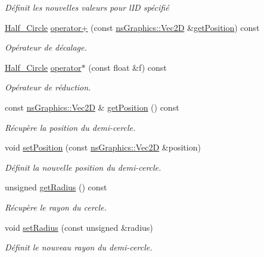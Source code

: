 \begin{DoxyCompactItemize}
\begin{DoxyCompactList}\small\item\em Définit les nouvelles valeurs pour l\textquotesingle{}ID spécifié \end{DoxyCompactList}\item 
\hyperlink{classhalf__circle_1_1_half___circle}{Half\+\_\+\+Circle} \hyperlink{classhalf__circle_1_1_half___circle_aad1321266f1c80f93426c7b0f906700b}{operator+} (const \hyperlink{classns_graphics_1_1_vec2_d}{ns\+Graphics\+::\+Vec2D} \&\hyperlink{classhalf__circle_1_1_half___circle_abf7d74a747e38464e7897a4e1c54caad}{get\+Position}) const
\begin{DoxyCompactList}\small\item\em Opérateur de décalage. \end{DoxyCompactList}\item 
\hyperlink{classhalf__circle_1_1_half___circle}{Half\+\_\+\+Circle} \hyperlink{classhalf__circle_1_1_half___circle_a378f3ccdfd80602eef6123812aa6281e}{operator$\ast$} (const float \&f) const
\begin{DoxyCompactList}\small\item\em Opérateur de réduction. \end{DoxyCompactList}\item 
const \hyperlink{classns_graphics_1_1_vec2_d}{ns\+Graphics\+::\+Vec2D} \& \hyperlink{classhalf__circle_1_1_half___circle_abf7d74a747e38464e7897a4e1c54caad}{get\+Position} () const
\begin{DoxyCompactList}\small\item\em Récupère la position du demi-\/cercle. \end{DoxyCompactList}\item 
void \hyperlink{classhalf__circle_1_1_half___circle_aef4c8e9f8a7d86c0062511ee24646afa}{set\+Position} (const \hyperlink{classns_graphics_1_1_vec2_d}{ns\+Graphics\+::\+Vec2D} \&position)
\begin{DoxyCompactList}\small\item\em Définit la nouvelle position du demi-\/cercle. \end{DoxyCompactList}\item 
unsigned \hyperlink{classhalf__circle_1_1_half___circle_a528419d14294a981dbc6cfde14c198fe}{get\+Radius} () const
\begin{DoxyCompactList}\small\item\em Récupère le rayon du cercle. \end{DoxyCompactList}\item 
void \hyperlink{classhalf__circle_1_1_half___circle_a84af21356a58484b2de1702e64c162dd}{set\+Radius} (const unsigned \&radius)
\begin{DoxyCompactList}\small\item\em Définit le nouveau rayon du demi-\/cercle. \end{DoxyCompactList}\end{DoxyCompactItemize}
